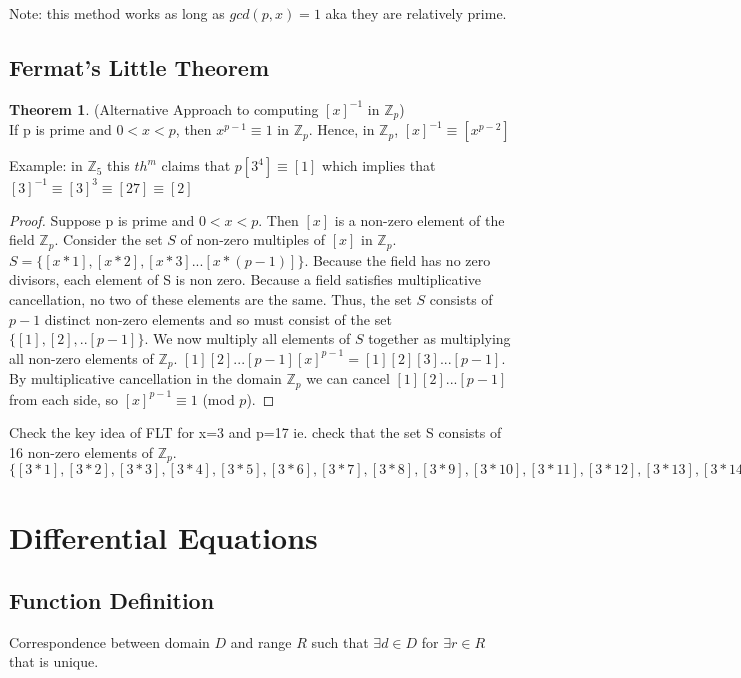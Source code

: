 \documentclass{article}
\theoremstyle{definition}
\newtheorem{theorem}{Theorem}
\theoremstyle{remark}
\begin{document}
Note: this method works as long as $gcd(p,x) = 1$ aka they are relatively prime.\\

\subsection{Fermat's Little Theorem}
\begin{theorem}
(Alternative Approach to computing $[x]^{-1}$ in $\mathbb{Z}_{p}$)\\
If p is prime and $0 < x < p$, then $x^{p-1} \equiv 1$ in $\mathbb{Z}_{p}$. Hence, in $\mathbb{Z}_{p}$, $[x]^{-1} \equiv  [x^{p-2}]$
\end{theorem}

Example: in $\mathbb{Z}_{5}$ this $th^{m}$ claims that $p[3^4] \equiv [1]$ which implies that $[3]^{-1} \equiv [3]^{3} \equiv [27] \equiv [2]$

\begin{proof}
Suppose p is prime and $0 < x < p$. Then $[x]$ is a non-zero element of the field $\mathbb{Z}_p$. Consider the set $S$ of non-zero multiples of $[x]$ in $\mathbb{Z}_p$. $S = \{ [x*1],[x*2],[x*3]...[x*(p-1)]\}$. Because the field has no zero divisors, each element of S is non zero. Because a field satisfies multiplicative cancellation, no two of these elements are the same. Thus, the set $S$ consists of $p-1$ distinct non-zero elements and so must consist of the set $\{ [1], [2],..[p-1]\}$. We now multiply all elements of $S$ together as multiplying all non-zero elements of $\mathbb{Z}_p$. $[1][2]...[p-1][x]^{p-1} = [1][2][3]...[p-1]$. By multiplicative cancellation in the domain $\mathbb{Z}_p$ we can cancel $[1][2]...[p-1]$ from each side, so $[x]^{p-1} \equiv 1$ (mod $p$).
\end{proof}

Check the key idea of FLT for x=3 and p=17 ie. check that the set S consists of 16 non-zero elements of $\mathbb{Z}_p$.\\
$\{[3*1], [3*2], [3*3], [3*4], [3*5], [3*6], [3*7], [3*8], [3*9], [3*10], [3*11], [3*12], [3*13], [3*14], [3*15], [3*16]\} \equiv \{ [3], [6], [9], [12], 15], [1], [4], [7], [10], [13], [16], [2], [5], [8], [11], [14]\}$


\section{Differential Equations}
\subsection{Function Definition}
Correspondence between domain $D$ and range $R$ such that $\exists d \in D $ for $\exists r \in R$ that is unique.\\
\end{document}
